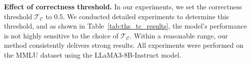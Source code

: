 


\textbf{Effect of correctness threshold.}
In our experiments, we set the correctness threshold \( \mathcal{T}_{\mathcal{C}} \) to 0.5. We conducted detailed experiments to determine this threshold, and as shown in Table~\ref{tab:ths_tc_results}, the model's performance is not highly sensitive to the choice of \( \mathcal{T}_{\mathcal{C}} \). Within a reasonable range, our method consistently delivers strong results. All experiments were performed on the MMLU dataset using the LLaMA3-8B-Instruct model.
